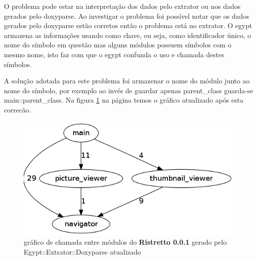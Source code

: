 O problema pode estar na interpretação dos dados pelo extrator ou nos dados
gerados pelo doxyparse. Ao investigar o problema foi possível notar que os
dados gerados pelo doxyparse estão corretos então o problema está no extrator. O
egypt armazena as informações usando como chave, ou seja, como identificador
único, o nome do símbolo em questão mas alguns módulos possuem símbolos com o
mesmo nome, isto faz com que o egypt confunda o uso e chamada destes símbolos.

A solução adotada para este problema foi armazenar o nome do módulo junto ao
nome do símbolo, por exemplo ao invés de guardar apenas parent\_class guarda-se
main::parent\_class. Na figura \ref{ristretto-0.0.1-doxyparse-2} na página
\pageref{ristretto-0.0.1-doxyparse-2} temos o gráfico atualizado após esta
correcão.

\begin{figure}
\center
\includegraphics[scale=0.5]{imagens/ristretto-0_0_1-doxyparse-2}
\caption{gráfico de chamada entre módulos do {\bf Ristretto 0.0.1} gerado pelo Egypt::Extrator::Doxyparse atualizado}
\label{ristretto-0.0.1-doxyparse-2}
\end{figure}

